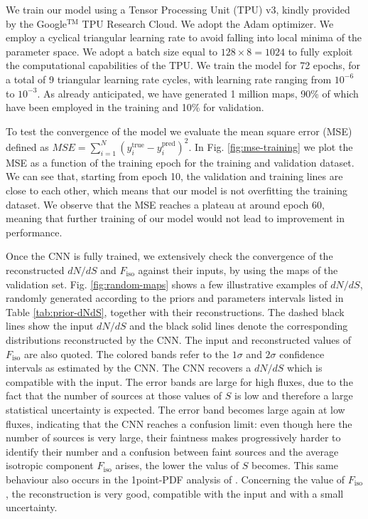 \documentclass[a4paper,11pt]{article}
\newcommand{\fiso}{{F_\textrm{iso}}}
\newcommand{\dnds}{dN/dS }
\begin{document}
We train our model using a Tensor Processing Unit (TPU) v3, kindly provided by the Google$^\textrm{TM}$ TPU Research Cloud. We adopt the Adam optimizer. We employ a cyclical triangular learning rate \cite{triangular} to avoid falling into local minima of the parameter space. We adopt a batch size equal to $128\times 8=1024$ to fully exploit the computational capabilities of the TPU. We train the model for 72 epochs, for a total of 9 triangular learning rate cycles, with learning rate ranging from $10^{-6}$ to $10^{-3}$. 
As already anticipated, we have generated 1 million maps, 90\% of which have been employed in the training and 10\% for validation.

To test the convergence of the model we evaluate the mean square error (MSE)  defined as $MSE=\sum_{i=1}^N (y_i^\textrm{true}-y_i^\textrm{pred})^2$. 
In Fig. \ref{fig:mse-training} we plot the MSE as a function of the training epoch for the training and validation dataset. We can see that, starting from epoch 10, the validation and training lines are close to each other, which means that our model is not overfitting the training dataset. We observe that the MSE reaches a plateau at around epoch 60, meaning that further training of our model would not lead to  improvement in performance.

Once the CNN is fully trained, we extensively check the convergence of the reconstructed $\dnds$ and $\fiso$ against their inputs, by using the maps of the validation set. 
Fig. \ref{fig:random-maps} shows a few illustrative examples of $\dnds$, randomly generated according to the priors and parameters intervals listed in Table \ref{tab:prior-dNdS}, together with their reconstructions. 
The dashed black lines show the input $\dnds$ and the black solid lines denote the corresponding distributions reconstructed by the CNN. The  input and reconstructed values of $\fiso$ are also quoted. The colored bands refer to the $1\sigma$ and $2\sigma$ confidence intervals
as estimated by the CNN.
The CNN recovers a $\dnds$ which is compatible with the input. The error bands are large for high fluxes, due to the fact that the number of sources at those values of $S$ is low and therefore a large statistical uncertainty is expected. The error band becomes large again at low fluxes, indicating that the CNN reaches a confusion limit: even though here the number of sources is very large, their faintness makes progressively harder to identify their number and a confusion between faint sources and the average isotropic component $\fiso$ arises, the lower the valus of $S$ becomes. This same behaviour also occurs in the 1point-PDF analysis of \cite{Cuoco-1pdf}. Concerning the value of $\fiso$, the reconstruction is very good, compatible with the input and with a small uncertainty. 
\end{document}
